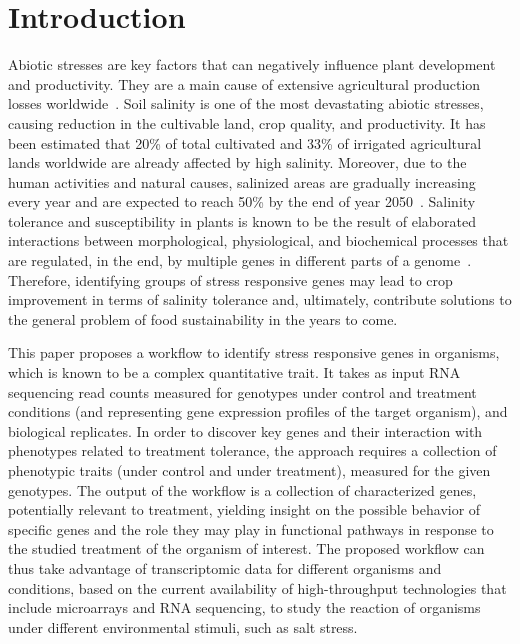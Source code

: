\section{Introduction}
\label{sec.intro}

Abiotic stresses are key factors that can negatively influence plant
development and productivity. They are a main cause of extensive
agricultural production losses worldwide~\cite{todo}. Soil salinity is
one of the most devastating abiotic stresses, causing reduction in the
cultivable land, crop quality, and productivity. It has been estimated
that 20\% of total cultivated and 33\% of irrigated agricultural lands
worldwide are already affected by high salinity. Moreover, due to the
human activities and natural causes, salinized areas are gradually
increasing every year and are expected to reach 50\% by the end of
year 2050~\cite{shrivastava2015soil}. Salinity tolerance and
susceptibility in plants is known to be the result of elaborated
interactions between morphological, physiological, and biochemical
processes that are regulated, in the end, by multiple genes in
different parts of a genome~\cite{reddy2017salt}. Therefore,
identifying groups of stress responsive genes may lead to crop
improvement in terms of salinity tolerance and, ultimately, contribute
solutions to the general problem of food sustainability in the years
to come.

This paper proposes a workflow to identify stress responsive genes in
organisms, which is known to be a complex quantitative trait. It takes
as input RNA sequencing read counts measured for genotypes under
control and treatment conditions (and representing gene expression
profiles of the target organism), and biological replicates.  In order
to discover key genes and their interaction with phenotypes related to
treatment tolerance, the approach requires a collection of phenotypic
traits (under control and under treatment), measured for the given
genotypes. The output of the workflow is a collection of characterized
genes, potentially relevant to treatment, yielding insight on the
possible behavior of specific genes and the role they may play in
functional pathways in response to the studied treatment of the
organism of interest. The proposed workflow can thus take advantage of
transcriptomic data for different organisms and conditions, based on
the current availability of high-throughput technologies that include
microarrays and RNA sequencing, to study the reaction of organisms
under different environmental stimuli, such as salt stress.



